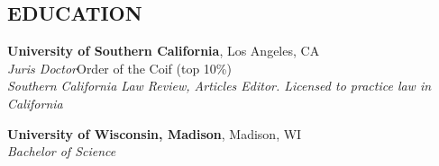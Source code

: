 \documentclass[margin]{res}
\begin{document}
\begin{resume}
\section{EDUCATION}

\textbf{University of Southern California}, Los Angeles, CA\\
{\sl Juris Doctor}\hfill Order of the Coif
(top 10\%)
\\
{\sl Southern California Law Review, Articles Editor. Licensed to practice law in California}

\textbf{University of Wisconsin, Madison}, Madison, WI\\
{\sl Bachelor of Science}

\end{resume}
\end{document}
